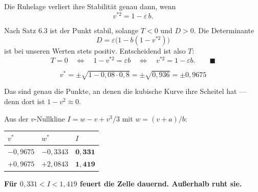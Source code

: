 \begin{merksatz}
Die Ruhelage verliert ihre Stabilität genau dann, wenn
\[ v^{*2} = 1 - \varepsilon\,b . \]

Nach Satz 6.3 ist der Punkt stabil, solange $T<0$ und $D>0$. Die Determinante
\[ D = \varepsilon\bigl(1-b(1-v^{*2})\bigr) \]
ist bei unseren Werten stets positiv. Entscheidend ist also $T$:
\[ T = 0 \quad\Longleftrightarrow\quad 1-v^{*2} = \varepsilon b \quad\Longleftrightarrow\quad v^{*2} = 1-\varepsilon b . \qquad \blacksquare \]

\[ v^{*} = \pm\sqrt{1 - 0{,}08 \cdot 0{,}8} = \pm\sqrt{0{,}936} = \pm 0{,}9675 \]

Das sind genau die Punkte, an denen die kubische Kurve ihre Scheitel hat --- denn dort ist $1-v^2 \approx 0$.

Aus der $v$-Nullkline $I = w - v + v^3/3$ mit $w = (v+a)/b$:
\begin{center}
\renewcommand{\arraystretch}{1.48}
\begin{tabular}{@{}P{2.0cm}P{2.0cm}P{2.6cm}@{}}
\toprule
$v^{*}$ & $w^{*}$ & $I$\\
\midrule
$-0{,}9675$ & $-0{,}3343$ & $\mathbf{0{,}331}$\\
$+0{,}9675$ & $+2{,}0843$ & $\mathbf{1{,}419}$\\
\bottomrule
\end{tabular}
\end{center}

\begin{center}
\begin{minipage}{0.9\textwidth}
\textbf{Für $0{,}331 < I < 1{,}419$ feuert die Zelle dauernd. Außerhalb ruht sie.}
\end{minipage}
\end{center}
\end{merksatz}

